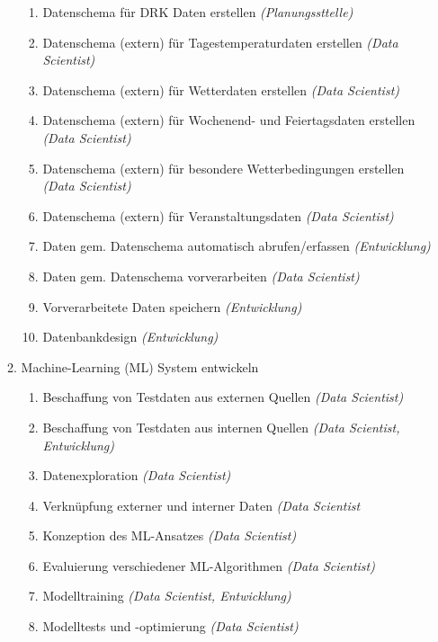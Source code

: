 \begin{enumerate}
\begin{enumerate}
\begin{enumerate}
					\item Datenschema für DRK Daten erstellen \colorbox{hellrot}{\textit{(Planungssttelle)}} 
					\item Datenschema (extern) für Tagestemperaturdaten erstellen \colorbox{hellgreen}{\textit{(Data Scientist)}}
					\item Datenschema (extern) für Wetterdaten erstellen\colorbox{hellgreen}{ \textit{(Data Scientist)}} 
					\item Datenschema (extern) für Wochenend- und Feiertagsdaten erstellen \colorbox{hellgreen}{\textit{(Data Scientist)}} 
					\item Datenschema (extern) für besondere Wetterbedingungen erstellen \colorbox{hellgreen}{\textit{(Data Scientist)}} 
					\item Datenschema (extern) für Veranstaltungsdaten\colorbox{hellgreen}{ \textit{(Data Scientist)}} 
					\item Daten gem. Datenschema automatisch abrufen/erfassen \colorbox{hellgreen}{\textit{(Entwicklung)}} 
					\item Daten gem. Datenschema vorverarbeiten\colorbox{hellrot}{ \textit{(Data Scientist)}} 
					\item Vorverarbeitete Daten speichern \colorbox{hellrot}{\textit{(Entwicklung)}} 
					\item Datenbankdesign \colorbox{hellrot}{\textit{(Entwicklung)}} 
				\end{enumerate}			
			\item Machine-Learning (ML) System entwickeln
				\begin{enumerate}
					\item Beschaffung von Testdaten aus externen Quellen \colorbox{hellgelb}{\textit{(Data Scientist)}} 
					\item Beschaffung von Testdaten aus internen Quellen \colorbox{hellrot}{\textit{(Data Scientist, Entwicklung)}} 
					\item Datenexploration \colorbox{hellrot}{\textit{(Data Scientist)}} 
					\item Verknüpfung externer und interner Daten \colorbox{hellgelb}{\textit{(Data Scientist}} 
					\item Konzeption des ML-Ansatzes \colorbox{hellrot}{\textit{(Data Scientist)}} 
					\item Evaluierung verschiedener ML-Algorithmen \colorbox{hellrot}{\textit{(Data Scientist)}} 
					\item Modelltraining \colorbox{hellrot}{\textit{(Data Scientist, Entwicklung)}} 
					\item Modelltests und -optimierung \colorbox{hellrot}{\textit{(Data Scientist)}} 

\end{enumerate}
\end{enumerate}
\end{enumerate}
